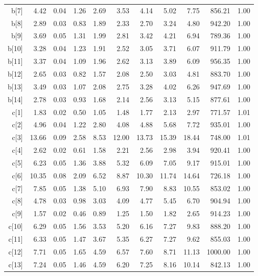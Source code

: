 \begin{longtable}{rrrrrrrrrrr}
  b[7] & 4.42 & 0.04 & 1.26 & 2.69 & 3.53 & 4.14 & 5.02 & 7.75 & 856.21 & 1.00 \\ 
  b[8] & 2.89 & 0.03 & 0.83 & 1.89 & 2.33 & 2.70 & 3.24 & 4.80 & 942.20 & 1.00 \\ 
  b[9] & 3.69 & 0.05 & 1.31 & 1.99 & 2.81 & 3.42 & 4.21 & 6.94 & 789.36 & 1.00 \\ 
  b[10] & 3.28 & 0.04 & 1.23 & 1.91 & 2.52 & 3.05 & 3.71 & 6.07 & 911.79 & 1.00 \\ 
  b[11] & 3.37 & 0.04 & 1.09 & 1.96 & 2.62 & 3.13 & 3.89 & 6.09 & 956.35 & 1.00 \\ 
  b[12] & 2.65 & 0.03 & 0.82 & 1.57 & 2.08 & 2.50 & 3.03 & 4.81 & 883.70 & 1.00 \\ 
  b[13] & 3.49 & 0.03 & 1.07 & 2.08 & 2.75 & 3.28 & 4.02 & 6.26 & 947.69 & 1.00 \\ 
  b[14] & 2.78 & 0.03 & 0.93 & 1.68 & 2.14 & 2.56 & 3.13 & 5.15 & 877.61 & 1.00 \\ 
  c[1] & 1.83 & 0.02 & 0.50 & 1.05 & 1.48 & 1.77 & 2.13 & 2.97 & 771.57 & 1.01 \\ 
  c[2] & 4.96 & 0.04 & 1.22 & 2.80 & 4.08 & 4.88 & 5.68 & 7.72 & 935.01 & 1.00 \\ 
  c[3] & 13.66 & 0.09 & 2.58 & 8.53 & 12.00 & 13.73 & 15.39 & 18.44 & 748.00 & 1.01 \\ 
  c[4] & 2.62 & 0.02 & 0.61 & 1.58 & 2.21 & 2.56 & 2.98 & 3.94 & 920.41 & 1.00 \\ 
  c[5] & 6.23 & 0.05 & 1.36 & 3.88 & 5.32 & 6.09 & 7.05 & 9.17 & 915.01 & 1.00 \\ 
  c[6] & 10.35 & 0.08 & 2.09 & 6.52 & 8.87 & 10.30 & 11.74 & 14.64 & 726.18 & 1.00 \\ 
  c[7] & 7.85 & 0.05 & 1.38 & 5.10 & 6.93 & 7.90 & 8.83 & 10.55 & 853.02 & 1.00 \\ 
  c[8] & 4.78 & 0.03 & 0.98 & 3.03 & 4.09 & 4.77 & 5.45 & 6.70 & 904.94 & 1.00 \\ 
  c[9] & 1.57 & 0.02 & 0.46 & 0.89 & 1.25 & 1.50 & 1.82 & 2.65 & 914.23 & 1.00 \\ 
  c[10] & 6.29 & 0.05 & 1.56 & 3.53 & 5.20 & 6.16 & 7.27 & 9.83 & 888.20 & 1.00 \\ 
  c[11] & 6.33 & 0.05 & 1.47 & 3.67 & 5.35 & 6.27 & 7.27 & 9.62 & 855.03 & 1.00 \\ 
  c[12] & 7.71 & 0.05 & 1.65 & 4.59 & 6.57 & 7.60 & 8.71 & 11.13 & 1000.00 & 1.00 \\ 
  c[13] & 7.24 & 0.05 & 1.46 & 4.59 & 6.20 & 7.25 & 8.16 & 10.14 & 842.13 & 1.00 \\ 

\end{longtable}
